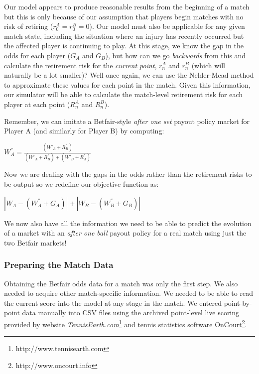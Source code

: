 \documentclass[letterpaper,12pt]{article}
\begin{document}
Our model appears to produce reasonable results from the beginning of a match but this is only because of our assumption that players begin matches with no risk of retiring ($r_0^A = r_0^B = 0$).  Our model must also be applicable for any given match state, including the situation where an injury has recently occurred but the affected player is continuing to play.  At this stage, we know the gap in the odds for each player ($G_A$ and $G_B$), but how can we go \textit{backwards} from this and calculate the retirement risk for the \textit{current point}, $r_n^A$ and $r_n^B$ (which will naturally be a lot smaller)?  Well once again, we can use the Nelder-Mead method to approximate these values for each point in the match.  Given this information, our simulator will be able to calculate the match-level retirement risk for each player at each point ($R_n^A$ and $R_n^B$).

Remember, we can imitate a Betfair-style \textit{after one set} payout policy market for Player A (and similarly for Player B) by computing:

\begin{center}
	$W_A^{''} = \frac{(W'_A + R_B^{''})}{(W'_A + R_B^{''}) + (W'_B + R_A^{''})}$
\end{center}

Now we are dealing with the gaps in the odds rather than the retirement risks to be output so we redefine our objective function as:

\begin{center}
	$\left|W_A - (W_A^{''} + G_A)\right| + \left|W_B - (W_B^{''} + G_B)\right|$
\end{center}

We now also have all the information we need to be able to predict the evolution of a market with an \textit{after one ball} payout policy for a real match using just the two Betfair markets!

\subsubsection{Preparing the Match Data}

Obtaining the Betfair odds data for a match was only the first step.  We also needed to acquire other match-specific information.  We needed to be able to read the current score into the model at any stage in the match.  We entered point-by-point data manually into CSV files using the archived point-level live scoring provided by website \textit{TennisEarth.com}\footnote{http://www.tennisearth.com} and tennis statistics software OnCourt\footnote{http://www.oncourt.info}.  
\end{document}
